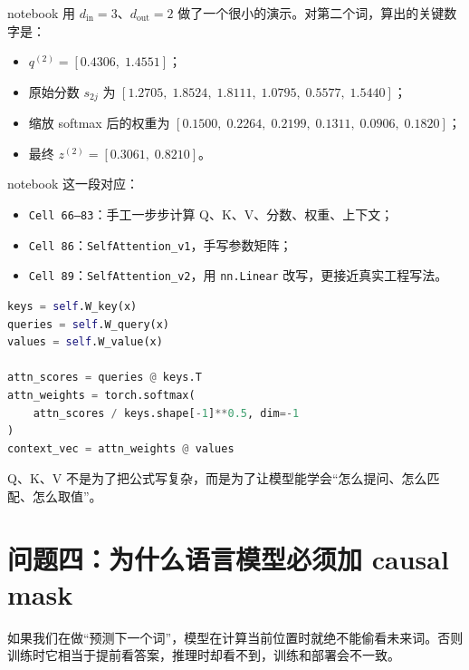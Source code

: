 \documentclass[11pt,a4paper]{ctexart}
\begin{document}
notebook 用 \(d_{\text{in}}=3\)、\(d_{\text{out}}=2\) 做了一个很小的演示。对第二个词，算出的关键数字是：

\begin{itemize}
  \item \(q^{(2)} = [0.4306,\; 1.4551]\)；
  \item 原始分数 \(s_{2j}\) 为 \([1.2705,\; 1.8524,\; 1.8111,\; 1.0795,\; 0.5577,\; 1.5440]\)；
  \item 缩放 softmax 后的权重为 \([0.1500,\; 0.2264,\; 0.2199,\; 0.1311,\; 0.0906,\; 0.1820]\)；
  \item 最终 \(z^{(2)} = [0.3061,\; 0.8210]\)。
\end{itemize}

\begin{codeblock}
notebook 这一段对应：
\begin{itemize}
  \item \texttt{Cell 66--83}：手工一步步计算 Q、K、V、分数、权重、上下文；
  \item \texttt{Cell 86}：\texttt{SelfAttention\_v1}，手写参数矩阵；
  \item \texttt{Cell 89}：\texttt{SelfAttention\_v2}，用 \texttt{nn.Linear} 改写，更接近真实工程写法。
\end{itemize}

\begin{lstlisting}[language=Python]
keys = self.W_key(x)
queries = self.W_query(x)
values = self.W_value(x)

attn_scores = queries @ keys.T
attn_weights = torch.softmax(
    attn_scores / keys.shape[-1]**0.5, dim=-1
)
context_vec = attn_weights @ values
\end{lstlisting}
\end{codeblock}

\begin{keypointblock}
Q、K、V 不是为了把公式写复杂，而是为了让模型能学会“怎么提问、怎么匹配、怎么取值”。
\end{keypointblock}

\section{问题四：为什么语言模型必须加 causal mask}

\begin{problemblock}
如果我们在做“预测下一个词”，模型在计算当前位置时就绝不能偷看未来词。否则训练时它相当于提前看答案，推理时却看不到，训练和部署会不一致。
\end{problemblock}
\end{document}
